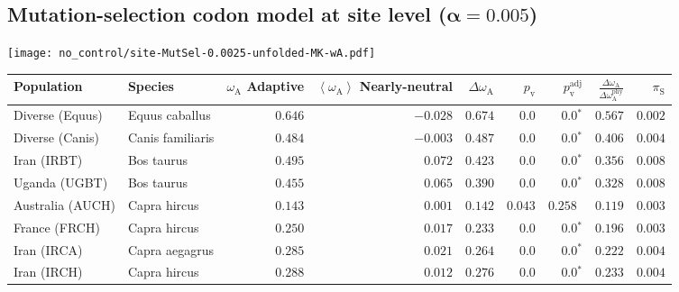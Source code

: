 \subsection{Mutation-selection codon model at site level ($\bm{\alpha=0.005}$)}
\begin{center}
    \texttt{[image: no\_control/site-MutSel-0.0025-unfolded-MK-wA.pdf]}
    \begin{adjustbox}{width = 1\textwidth}
        \begin{tabular}{|l|l|r|r|r|r|r|r|r|}
            \toprule
            Population & Species & \specialcell{$\omega_{\mathrm{A}}$ \\ Adaptive}                & \specialcell{$\left< \omega_{\mathrm{A}} \right>$ \\ Nearly-neutral}                & $\Delta \omega_{\mathrm{A}} $    & $p_{\mathrm{v}}$ & $p_{\mathrm{v}}^{\mathrm{adj}}$   & $\frac{\Delta\omega_{\mathrm{A}}}{\Delta\omega_{\mathrm{A}}^{\mathrm{phy}}}$ & $\pi_{\textrm{S}}$    \\
            \midrule
            Diverse (Equus)                    & Equus caballus          & $ 0.646$ & $-0.028$   & $ 0.674$ & $0.0$    & $\bm{0.0{^*}}$ & $ 0.567$ & $ 0.002$ \\
            Diverse (Canis)                  & Canis familiaris          & $ 0.484$ & $-0.003$   & $ 0.487$ & $0.0$    & $\bm{0.0{^*}}$ & $ 0.406$ & $ 0.004$ \\
            Iran (IRBT)               & Bos taurus        & $ 0.495$ & $ 0.072$   & $ 0.423$ & $0.0$ & $\bm{0.0{^*}}$     & $ 0.356$ & $ 0.008$ \\
            Uganda (UGBT)                  & Bos taurus        & $ 0.455$ & $ 0.065$   & $ 0.390$ & $0.0$    & $\bm{0.0{^*}}$ & $ 0.328$ & $ 0.008$ \\
            Australia (AUCH)                    & Capra hircus      & $ 0.143$ & $ 0.001$   & $ 0.142$ & $ 0.043$    & $ 0.258~~$ & $ 0.119$ & $ 0.003$ \\
            France (FRCH)                    & Capra hircus        & $ 0.250$ & $ 0.017$   & $ 0.233$ & $0.0$    & $\bm{0.0{^*}}$ & $ 0.196$ & $ 0.003$ \\
            Iran (IRCA)                   & Capra aegagrus        & $ 0.285$ & $ 0.021$   & $ 0.264$ & $0.0$    & $\bm{0.0{^*}}$ & $ 0.222$ & $ 0.004$ \\
            Iran (IRCH)                 & Capra hircus        & $ 0.288$ & $ 0.012$   & $ 0.276$ & $0.0$    & $\bm{0.0{^*}}$ & $ 0.233$ & $ 0.004$ \\

\end{tabular}
\end{adjustbox}
\end{center}
